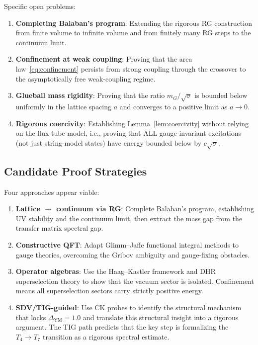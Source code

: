 \documentclass[11pt]{article}
\begin{document}
Specific open problems:
\begin{enumerate}
  \item \textbf{Completing Balaban's program}: Extending the rigorous
    RG construction from finite volume to infinite volume and from
    finitely many RG steps to the continuum limit.
  \item \textbf{Confinement at weak coupling}: Proving that the area
    law~\eqref{eq:confinement} persists from strong coupling through
    the crossover to the asymptotically free weak-coupling regime.
  \item \textbf{Glueball mass rigidity}: Proving that the ratio
    $m_G/\sqrt{\sigma}$ is bounded below uniformly in the lattice
    spacing $a$ and converges to a positive limit as $a \to 0$.
  \item \textbf{Rigorous coercivity}: Establishing
    Lemma~\ref{lem:coercivity} without relying on the flux-tube
    model, i.e., proving that ALL gauge-invariant excitations (not
    just string-model states) have energy bounded below by
    $c\sqrt{\sigma}$.
\end{enumerate}

\subsection{Candidate Proof Strategies}

Four approaches appear viable:
\begin{enumerate}
  \item \textbf{Lattice $\to$ continuum via RG}: Complete Balaban's
    program, establishing UV stability and the continuum limit, then
    extract the mass gap from the transfer matrix spectral gap.
  \item \textbf{Constructive QFT}: Adapt Glimm--Jaffe functional
    integral methods to gauge theories, overcoming the Gribov
    ambiguity and gauge-fixing obstacles.
  \item \textbf{Operator algebras}: Use the Haag--Kastler framework
    and DHR superselection theory to show that the vacuum sector is
    isolated.  Confinement means all superselection sectors carry
    strictly positive energy.
  \item \textbf{SDV/TIG-guided}: Use CK probes to identify the
    structural mechanism that locks $\Delta_{\mathrm{YM}} = 1.0$ and
    translate this structural insight into a rigorous argument.  The
    TIG path predicts that the key step is formalizing the
    $T_4 \to T_7$ transition as a rigorous spectral estimate.
\end{enumerate}
\end{document}

